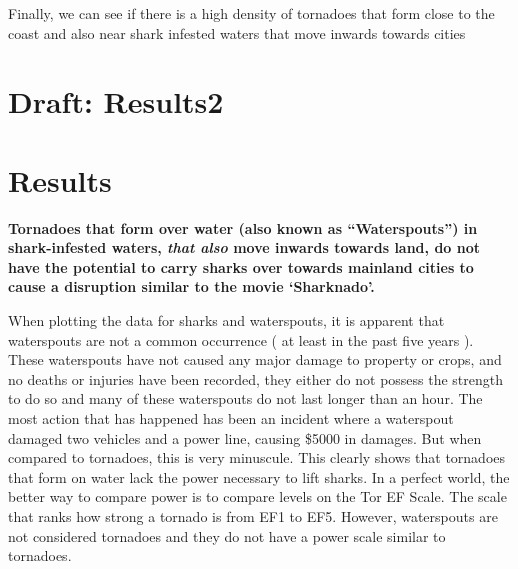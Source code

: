 \documentclass[
  letterpaper,
  DIV=11,
  numbers=noendperiod]{scrreprt}
\newenvironment{Shaded}{\begin{snugshade}}{\end{snugshade}}
\newcommand{\AttributeTok}[1]{\textcolor[rgb]{0.40,0.45,0.13}{#1}}
\newcommand{\FunctionTok}[1]{\textcolor[rgb]{0.28,0.35,0.67}{#1}}
\newcommand{\NormalTok}[1]{\textcolor[rgb]{0.00,0.23,0.31}{#1}}
\newcommand{\SpecialCharTok}[1]{\textcolor[rgb]{0.37,0.37,0.37}{#1}}
\newcommand{\StringTok}[1]{\textcolor[rgb]{0.13,0.47,0.30}{#1}}
\begin{document}
Finally, we can see if there is a high density of tornadoes that form
close to the coast and also near shark infested waters that move inwards
towards cities

\chapter{Draft: Results2}\label{draft-results2}

\chapter{Results}\label{results}

\textbf{Tornadoes that form over water (also known as ``Waterspouts'')
in shark-infested waters, \emph{that also} move inwards towards land, do
not have the potential to carry sharks over towards mainland cities to
cause a disruption similar to the movie `Sharknado'.}

When plotting the data for sharks and waterspouts, it is apparent that
waterspouts are not a common occurrence ( at least in the past five
years ). These waterspouts have not caused any major damage to property
or crops, and no deaths or injuries have been recorded, they either do
not possess the strength to do so and many of these waterspouts do not
last longer than an hour. The most action that has happened has been an
incident where a waterspout damaged two vehicles and a power line,
causing \$5000 in damages. But when compared to tornadoes, this is very
minuscule. This clearly shows that tornadoes that form on water lack the
power necessary to lift sharks. In a perfect world, the better way to
compare power is to compare levels on the Tor EF Scale. The scale that
ranks how strong a tornado is from EF1 to EF5. However, waterspouts are
not considered tornadoes and they do not have a power scale similar to
tornadoes.

\begin{Shaded}
\end{Shaded}
\end{document}
